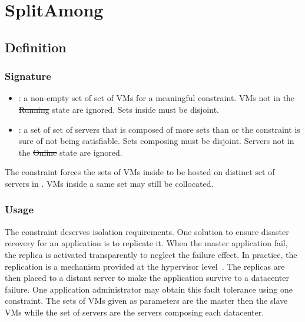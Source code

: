 \section{SplitAmong}

\subsection{Definition}

\subsubsection{Signature} 

\begin{itemize}
\item {} : a non-empty set of set of VMs for a meaningful constraint. VMs not in the \st{Running} state are ignored. Sets inside  must be disjoint.
\item {} : a set of set of servers that is composed of more sets than  or the constraint is sure of not being satisfiable.
Sets composing  must be disjoint. Servers not in the \st{Online} state are ignored.
\end{itemize}

The  constraint forces the sets of VMs inside 
to be hosted on distinct set of servers in . VMs inside a same set may still be collocated.


\subsubsection{Usage}

The  constraint deserves isolation requirements. One solution to ensure disaster recovery for an application is to replicate it. When the master application fail, the replica is activated transparently to neglect the failure effect. In practice, the replication is a mechanism provided at the hypervisor level~\cite{remus,vmwareFT}. The replicas are then placed to a distant server to make the application survive
to a datacenter failure. One application administrator may obtain this fault tolerance using one  constraint. The sets of VMs given as parameters are the master then the slave VMs while the
set of servers are the servers composing each datacenter.


